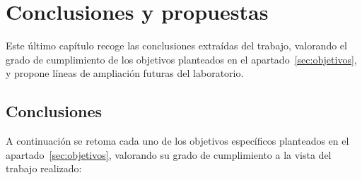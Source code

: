 \chapter{Conclusiones y propuestas}
\label{cap:conclusiones}

Este último capítulo recoge las conclusiones extraídas del trabajo,
valorando el grado de cumplimiento de los objetivos planteados en el
apartado~\ref{sec:objetivos}, y propone líneas de ampliación futuras del laboratorio.

\section{Conclusiones}

A continuación se retoma cada uno de los objetivos específicos planteados
en el apartado~\ref{sec:objetivos}, valorando su grado de cumplimiento a la vista del
trabajo realizado:

